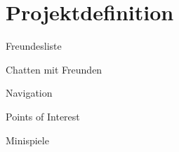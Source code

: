 \chapter{Projektdefinition}

\begin{capitemize}[Projektdefinition]
	 \item Freundesliste
	 \item Chatten mit Freunden
	 \item Navigation
	 \item Points of Interest
	 \item Minispiele
\end{capitemize}